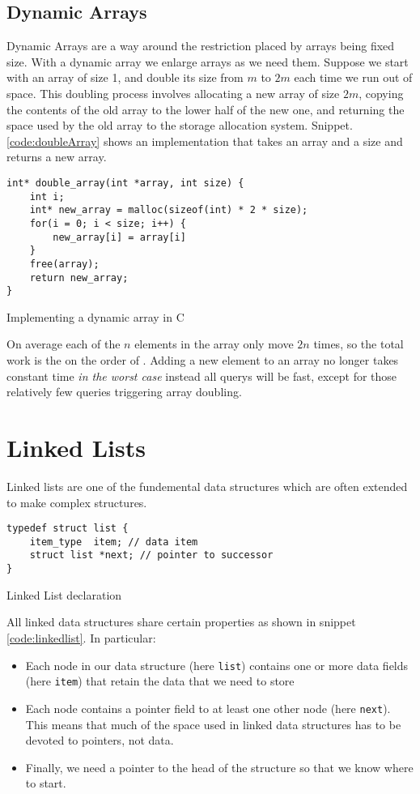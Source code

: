 	\subsection{Dynamic Arrays}
		Dynamic Arrays are a way around the restriction placed by arrays being fixed size. With a dynamic array we enlarge arrays as we need them. Suppose we start with an array of size 1, and double its size from $m$ to $2m$ each time we run out of space. This doubling process involves allocating a new array of size $2m$, copying the contents of the old array to the lower half of the new one, and returning the space used by the old array to the storage allocation system. Snippet. \ref{code:doubleArray} shows an implementation that takes an array and a size and returns a new array.
\begin{listing}[h]
	\begin{verbatim}
int* double_array(int *array, int size) {
	int i;
	int* new_array = malloc(sizeof(int) * 2 * size);
	for(i = 0; i < size; i++) {
		new_array[i] = array[i]
	}
	free(array);
	return new_array;
}
	\end{verbatim}
	\caption{\label{code:doubleArray} Implementing a dynamic array in C}
\end{listing}

	On average each of the $n$ elements in the array only move $2n$ times, so the total work is the on the order of . Adding a new element to an array no longer takes constant time \textit{in the worst case} instead all querys will be fast, except for those relatively few queries triggering array doubling.

\section{Linked Lists}
	Linked lists are one of the fundemental data structures which are often extended to make complex structures.
\begin{listing}[h]
	\begin{verbatim}
typedef struct list {
	item_type  item; // data item
 	struct list *next; // pointer to successor
}
\end{verbatim}
	\caption{\label{code:linkedlist} Linked List declaration}
\end{listing}
	All linked data structures share certain properties as shown in snippet \ref{code:linkedlist}. In particular:
	\begin{itemize}
		\item Each node in our data structure (here \texttt{list}) contains one or more data fields (here \texttt{item}) that retain the data that we need to store
		\item Each node contains a pointer field to at least one other node (here \texttt{next}). This means that much of the space used in linked data structures has to be devoted to pointers, not data.
		\item Finally, we need a pointer to the head of the structure so that we know where to start.
	\end{itemize}

